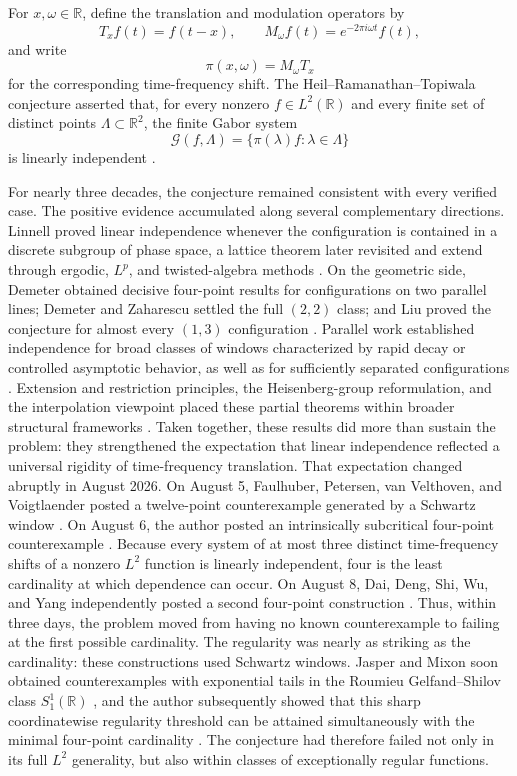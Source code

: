 \documentclass[reqno]{amsart}
\theoremstyle{remark}
\numberwithin{equation}{section}
\newcommand{\R}{\mathbb{R}}
\begin{document}
For \(x,\omega\in\R\), define the translation and modulation operators by
\[
  T_xf(t)=f(t-x),
  \qquad
  M_\omega f(t)=e^{-2\pi i\omega t}f(t),
\]
and write
\[
  \pi(x,\omega)=M_\omega T_x
\]
for the corresponding time-frequency shift. The
Heil--Ramanathan--Topiwala conjecture asserted that, for every nonzero
\(f\in L^2(\R)\) and every finite set of distinct points
\(\Lambda\subset\R^2\), the finite Gabor system
\[
  \mathcal G(f,\Lambda)
  =
  \{\pi(\lambda)f:\lambda\in\Lambda\}
\]
is linearly independent \cite{HRT,HeilSurvey}.

For nearly three decades, the conjecture remained consistent with every
verified case. The positive evidence accumulated along several complementary
directions. Linnell proved linear independence whenever the configuration is
contained in a discrete subgroup of phase space, a lattice theorem later
revisited and extend through ergodic, \(L^p\), and twisted-algebra methods
\cite{Linnell,AntezanaBrunaPujals,EnstadVanVelthoven}. On the geometric side,
Demeter obtained decisive four-point results for configurations on two
parallel lines; Demeter and Zaharescu settled the full \((2,2)\) class; and Liu
proved the conjecture for almost every \((1,3)\) configuration
\cite{Demeter,DemeterZaharescu,Liu}. Parallel work established independence
for broad classes of windows characterized by rapid decay or controlled
asymptotic behavior, as well as for sufficiently separated configurations
\cite{BownikSpeegle,BenedettoBourouihiya,Kreisel}. Extension and restriction
principles, the Heisenberg-group reformulation, and the interpolation
viewpoint placed these partial theorems within broader structural frameworks
\cite{OkoudjouExtension,CurreyOussa,Berge}. Taken together, these results did
more than sustain the problem: they strengthened the expectation that linear
independence reflected a universal rigidity of time-frequency translation.
That expectation changed abruptly in August 2026. On August 5, Faulhuber,
Petersen, van Velthoven, and Voigtlaender posted a twelve-point counterexample
generated by a Schwartz window \cite{FaulhuberEtAl}. On August 6, the author
posted an intrinsically subcritical four-point counterexample
\cite{OussaCounterexample}. Because every system of at most three distinct
time-frequency shifts of a nonzero \(L^2\) function is linearly independent,
four is the least cardinality at which dependence can occur. On August 8,
Dai, Deng, Shi, Wu, and Yang independently posted a second four-point
construction \cite{DaiEtAl}. Thus, within three days, the problem moved from
having no known counterexample to failing at the first possible cardinality.
The regularity was nearly as striking as the cardinality: these constructions
used Schwartz windows. Jasper and Mixon soon obtained counterexamples with
exponential tails in the Roumieu Gelfand--Shilov class \(S^1_1(\R)\)
\cite{JasperMixon}, and the author subsequently showed that this sharp
coordinatewise regularity threshold can be attained simultaneously with the
minimal four-point cardinality \cite{OussaSharpThreshold}. The conjecture had
therefore failed not only in its full \(L^2\) generality, but also within
classes of exceptionally regular functions.
\end{document}
